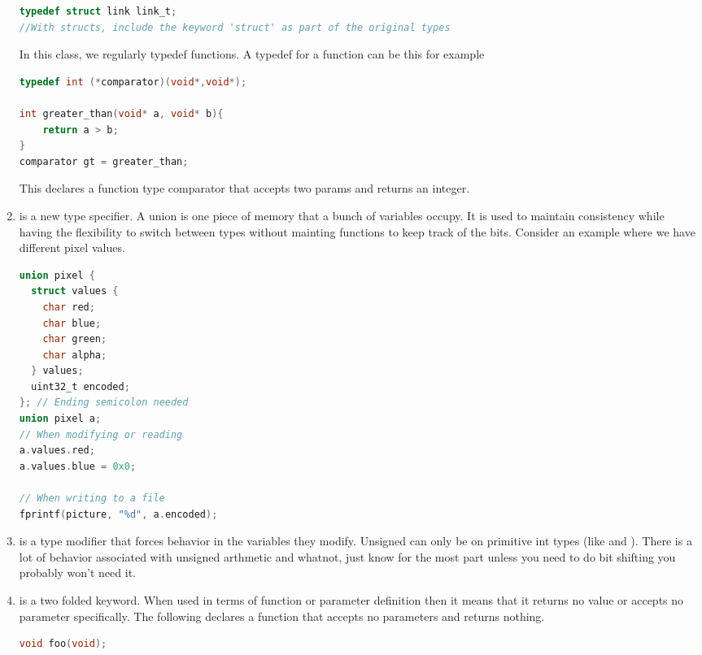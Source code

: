 \begin{enumerate}
\begin{lstlisting}[language=C]
typedef struct link link_t; 
//With structs, include the keyword 'struct' as part of the original types
\end{lstlisting}

In this class, we regularly typedef functions. A typedef for a function can be this for example

\begin{lstlisting}[language=C]
typedef int (*comparator)(void*,void*);

int greater_than(void* a, void* b){
    return a > b;
}
comparator gt = greater_than;
\end{lstlisting}

This declares a function type comparator that accepts two  params and returns an integer.

\item {} is a new type specifier. A union is one piece of memory that a bunch of variables occupy. It is used to maintain consistency while having the flexibility to switch between types without mainting functions to keep track of the bits. Consider an example where we have different pixel values.
\begin{lstlisting}[language=C]
union pixel {
  struct values {
    char red;
    char blue;
    char green;
    char alpha;
  } values;
  uint32_t encoded;
}; // Ending semicolon needed
union pixel a;
// When modifying or reading
a.values.red;
a.values.blue = 0x0;

// When writing to a file
fprintf(picture, "%d", a.encoded);
\end{lstlisting}

\item {} is a type modifier that forces  behavior in the variables they modify. Unsigned can only be on primitive int types (like  and ). There is a lot of behavior associated with unsigned arthmetic and whatnot, just know for the most part unless you need to do bit shifting you probably won't need it.

\item {} is a two folded keyword. When used in terms of function or parameter definition then it means that it returns no value or accepts no parameter specifically. The following declares a function that accepts no parameters and returns nothing.

\begin{lstlisting}[language=C]
void foo(void);
\end{lstlisting}



\end{enumerate}
